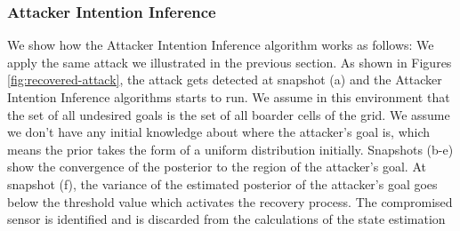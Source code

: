 \documentclass[letterpaper, 10 pt, conference]{ieeeconf}  %
\begin{document}
\subsubsection{Attacker Intention Inference}
We show how the Attacker Intention Inference algorithm works as follows: We apply the same attack we illustrated in the previous section. As shown in Figures \ref{fig:recovered-attack}, the attack gets detected at snapshot (a) and the Attacker Intention Inference algorithms starts to run. We assume in this environment that the set of all undesired goals is the set of all boarder cells of the grid. We assume we don't have any initial knowledge about where the attacker's goal is, which means the prior takes the form of a uniform distribution initially. Snapshots (b-e) show the convergence of the posterior to the region of the attacker's goal. At snapshot (f), the variance of the estimated posterior of the attacker's goal goes below the threshold value which activates the recovery process. The compromised sensor is identified and is discarded from the calculations of the state estimation
\end{document}
